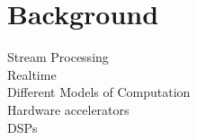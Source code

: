 \chapter{Background}
\label{chapter:background}
Stream Processing \\
Realtime \\
Different Models of Computation \\
Hardware accelerators \\
DSPs \\
